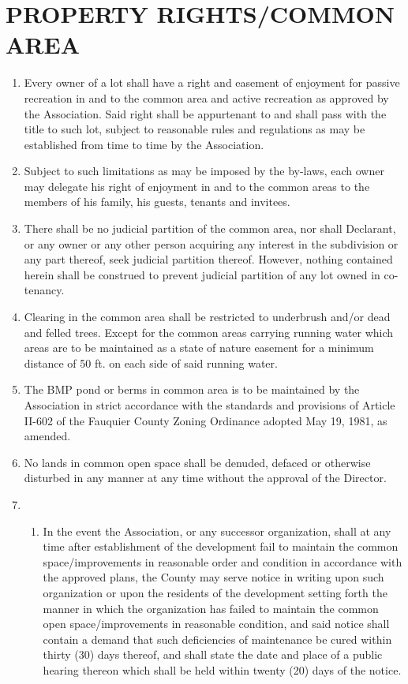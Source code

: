 \documentclass[10pt, letterpaper]{article}
\begin{document}
\section{PROPERTY RIGHTS/COMMON AREA}
\begin{enumerate}
  \item Every owner of a lot shall have a right and easement of enjoyment for passive recreation in and to the common area and active recreation as approved by the Association.
    Said right shall be appurtenant to and shall pass with the title to such lot, subject to reasonable rules and regulations as may be established from time to time by the Association.
  \item Subject to such limitations as may be imposed by the by-laws, each owner may delegate his right of enjoyment in and to the common areas to the members of his family, his guests, tenants and invitees.
  \item There shall be no judicial partition of the common area, nor shall Declarant, or any owner or any other person acquiring any interest in the subdivision or any part thereof, seek judicial partition thereof.
    However, nothing contained herein shall be construed to prevent judicial partition of any lot owned in co-tenancy.
  \item Clearing in the common area shall be restricted to underbrush and/or dead and felled trees.
    Except for the common areas carrying running water which areas are to be maintained as a state of nature easement for a minimum distance of 50 ft. on each side of said running water.
  \item The BMP pond or berms in common area is to be maintained by the Association in strict accordance with the standards and provisions of Article II-602 of the Fauquier County Zoning Ordinance adopted May 19, 1981, as amended.
  \item No lands in common open space shall be denuded, defaced or otherwise disturbed in any manner at any time without the approval of the Director.
  \item \begin{enumerate}
      \item In the event the Association, or any successor organization, shall at any time after establishment of the development fail to maintain the common space/improvements in reasonable order and condition in accordance with the approved plans, the County may serve notice in writing upon such organization or upon the residents of the development setting forth the manner in which the organization has failed to maintain the common open space/improvements in reasonable condition, and said notice shall contain a demand that such deficiencies of maintenance be cured within thirty (30) days thereof, and shall state the date and place of a public hearing thereon which shall be held within twenty (20) days of the notice.

\end{enumerate}
\end{enumerate}
\end{document}

